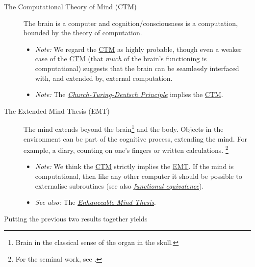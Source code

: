 \documentclass[logo,bsc,singlespacing,parskip]{infthesis}
\begin{document}
{ %
\begin{mdframed}
\begin{description}
\item[{The Computational Theory of Mind\label{computational theory of mind} (\label{org204d6ba}CTM)}] The brain is a computer and cognition/consciousness is a computation, bounded by the theory of computation.
\begin{itemize}
\item \emph{Note:} We regard the \hyperref[org204d6ba]{CTM} as highly probable, though even a weaker case of the \hyperref[org204d6ba]{CTM} (that \emph{much} of the brain's functioning is computational) suggests that the brain can be seamlessly interfaced with, and extended by, external computation.
\item \emph{Note:} The \emph{\hyperref[org78bb90f]{Church-Turing-Deutsch Principle}}  implies the \hyperref[org204d6ba]{CTM}.
\end{itemize}
\end{description}
\end{mdframed}

\begin{mdframed}
\begin{description}
\item[{The Extended Mind Thesis\label{extended mind thesis} (\label{org3b15c2d}EMT)}] The mind extends beyond the brain\footnote{Brain in the classical sense of the organ in the skull.} and the body.
Objects in the environment can be part of the cognitive process, extending the mind.
For example, a diary, counting on one's fingers or written calculations. \footnote{For the seminal work, see \autocite{ExtendedMindAndy}.}
\begin{itemize}
\item \emph{Note:} We think the \hyperref[org204d6ba]{CTM} strictly implies the \hyperref[org3b15c2d]{EMT}. If the mind is computational, then like any other computer it should be possible to externalise subroutines (see also \emph{\hyperref[org1ce07fc]{functional equivalence}}).
\item \emph{See also:} The \emph{\hyperref[org33f9226]{Enhanceable Mind Thesis}}.
\end{itemize}
\end{description}
\end{mdframed}

Putting the previous two results together yields

}
\end{document}
